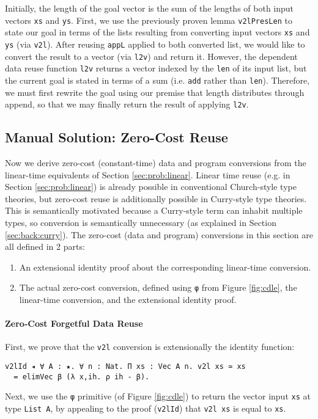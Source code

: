 \documentclass[acmsmall]{acmart}\settopmatter{}
\newcommand{\refsec}[1]{Section \ref{sec:#1}}
\newcommand{\labsec}[1]{\label{sec:#1}}
\newcommand{\reffig}[1]{Figure \ref{fig:#1}}
\begin{document}
Initially, the length of the goal vector is the sum of the lengths of
both input vectors \verb;xs; and \verb;ys;. First, we use the
previously proven lemma \verb;v2lPresLen; to state our goal in terms
of the lists resulting from converting input vectors \verb;xs; and
\verb;ys; (via \verb;v2l;). After reusing \verb;appL; applied to both
converted list, we would like to convert the result to a vector (via
\verb;l2v;) and return it. However, the dependent data reuse function
\verb;l2v; returns a vector indexed by the \verb;len; of its input
list, but the current goal is stated in terms of a sum
(i.e. \verb;add; rather than \verb;len;). Therefore, we must first
rewrite the goal using our premise that length distributes through
append, so that we may finally return the result of applying
\verb;l2v;.

\subsection{Manual Solution: Zero-Cost Reuse}
\labsec{prob:manual}

Now we derive zero-cost (constant-time) data and program conversions
from the linear-time equivalents of \refsec{prob:linear}.
Linear time reuse
(e.g. in \refsec{prob:linear}) is already possible in conventional
Church-style type theories, but zero-cost reuse is additionally
possible in Curry-style type theories. This is semantically motivated
because a Curry-style term can inhabit multiple types,
so conversion is semantically unnecessary
(as explained in \refsec{back:curry}).
The zero-cost (data and program) conversions in this section
are all defined in 2 parts:
\begin{enumerate}
\item An extensional identity proof about the corresponding linear-time conversion.
\item The actual zero-cost conversion, defined using \verb;φ; from
  \reffig{cdle}, the linear-time conversion, and the extensional
  identity proof.
\end{enumerate}

\paragraph{Zero-Cost Forgetful Data Reuse}

First, we prove that the \verb;v2l; conversion is extensionally the
identity function:

\begin{verbatim}
v2lId ◂ ∀ A : ★. ∀ n : Nat. Π xs : Vec A n. v2l xs ≃ xs 
  = elimVec β (λ x,ih. ρ ih - β).
\end{verbatim}
Next, we use the \verb;φ; primitive (of \reffig{cdle}) to return the
vector input \verb;xs; at type \verb;List A;, by appealing to the
proof (\verb;v2lId;) that \verb;v2l xs; is equal to \verb;xs;.
\end{document}
